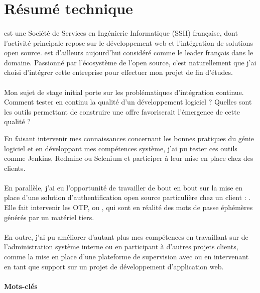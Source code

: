 \section*{Résumé technique}

\paragraph{}
\asmile{} est une Société de Services en Ingénierie Informatique (SSII) française, dont l'activité principale repose sur le développement web et l'intégration de solutions open source.
\asmile{} est d'ailleurs aujourd'hui considéré comme le leader français dans le domaine.
Passionné par l'écosystème de l'open source, c'est naturellement que j'ai choisi d'intégrer cette entreprise pour effectuer mon projet de fin d'études.

\paragraph{}
Mon sujet de stage initial porte sur les problématiques d'intégration continue.
Comment tester en continu la qualité d'un développement logiciel ?
Quelles sont les outils permettant de construire une offre favoriserait l'émergence de cette qualité ?

En faisant intervenir mes connaissances concernant les bonnes pratiques du génie logiciel et en développant mes compétences système, j'ai pu tester ces outils comme Jenkins, Redmine ou Selenium et participer à leur mise en place chez des clients.

\paragraph{}
En parallèle, j'ai eu l'opportunité de travailler de bout en bout sur la mise en place d'une solution d'authentification open source particulière chez un client : \alinotp.
Elle fait intervenir les OTP, ou , qui sont en réalité des mots de passe éphémères générés par un matériel tiers.

\paragraph{}
En outre, j'ai pu améliorer d'autant plus mes compétences en travaillant sur de l'administration système interne ou en participant à d'autres projets clients, comme la mise en place d'une plateforme de supervision avec \acentreon{} ou en intervenant en tant que support sur un projet de développement d'application web.

\paragraph{Mots-clés}
\makeatletter
\@keywords
\makeatother

